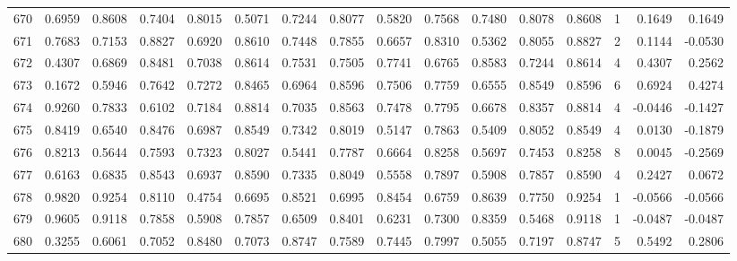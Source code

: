 \begin{tabular}{lrrrrrrrrrrrrrrr}
670 &      0.6959 &  0.8608 &  0.7404 &  0.8015 &  0.5071 &  0.7244 &  0.8077 &  0.5820 &  0.7568 &  0.7480 &   0.8078 &     0.8608 &      1 &                    0.1649 &                     0.1649 \\
671 &      0.7683 &  0.7153 &  0.8827 &  0.6920 &  0.8610 &  0.7448 &  0.7855 &  0.6657 &  0.8310 &  0.5362 &   0.8055 &     0.8827 &      2 &                    0.1144 &                    -0.0530 \\
672 &      0.4307 &  0.6869 &  0.8481 &  0.7038 &  0.8614 &  0.7531 &  0.7505 &  0.7741 &  0.6765 &  0.8583 &   0.7244 &     0.8614 &      4 &                    0.4307 &                     0.2562 \\
673 &      0.1672 &  0.5946 &  0.7642 &  0.7272 &  0.8465 &  0.6964 &  0.8596 &  0.7506 &  0.7759 &  0.6555 &   0.8549 &     0.8596 &      6 &                    0.6924 &                     0.4274 \\
674 &      0.9260 &  0.7833 &  0.6102 &  0.7184 &  0.8814 &  0.7035 &  0.8563 &  0.7478 &  0.7795 &  0.6678 &   0.8357 &     0.8814 &      4 &                   -0.0446 &                    -0.1427 \\
675 &      0.8419 &  0.6540 &  0.8476 &  0.6987 &  0.8549 &  0.7342 &  0.8019 &  0.5147 &  0.7863 &  0.5409 &   0.8052 &     0.8549 &      4 &                    0.0130 &                    -0.1879 \\
676 &      0.8213 &  0.5644 &  0.7593 &  0.7323 &  0.8027 &  0.5441 &  0.7787 &  0.6664 &  0.8258 &  0.5697 &   0.7453 &     0.8258 &      8 &                    0.0045 &                    -0.2569 \\
677 &      0.6163 &  0.6835 &  0.8543 &  0.6937 &  0.8590 &  0.7335 &  0.8049 &  0.5558 &  0.7897 &  0.5908 &   0.7857 &     0.8590 &      4 &                    0.2427 &                     0.0672 \\
678 &      0.9820 &  0.9254 &  0.8110 &  0.4754 &  0.6695 &  0.8521 &  0.6995 &  0.8454 &  0.6759 &  0.8639 &   0.7750 &     0.9254 &      1 &                   -0.0566 &                    -0.0566 \\
679 &      0.9605 &  0.9118 &  0.7858 &  0.5908 &  0.7857 &  0.6509 &  0.8401 &  0.6231 &  0.7300 &  0.8359 &   0.5468 &     0.9118 &      1 &                   -0.0487 &                    -0.0487 \\
680 &      0.3255 &  0.6061 &  0.7052 &  0.8480 &  0.7073 &  0.8747 &  0.7589 &  0.7445 &  0.7997 &  0.5055 &   0.7197 &     0.8747 &      5 &                    0.5492 &                     0.2806 \\

\end{tabular}
